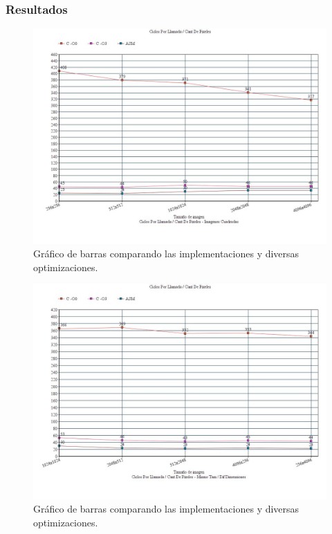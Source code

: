 \subsubsection{Resultados}

\begin{figure}[h!]
\centering
\captionsetup{justification=centering}
	\includegraphics[width = 15 cm, height = 8 cm]{imagenes/ImgCuadradas.jpg}
	\caption[center]{Gráfico de barras comparando las implementaciones y diversas optimizaciones.}
\end{figure}

\medskip\begin{figure}[h!]
\centering
\captionsetup{justification=centering}
	\includegraphics[width = 15 cm, height = 8 cm]{imagenes/DifDimensiones.jpg}
	\caption[center]{Gráfico de barras comparando las implementaciones y diversas optimizaciones.}
\end{figure}

